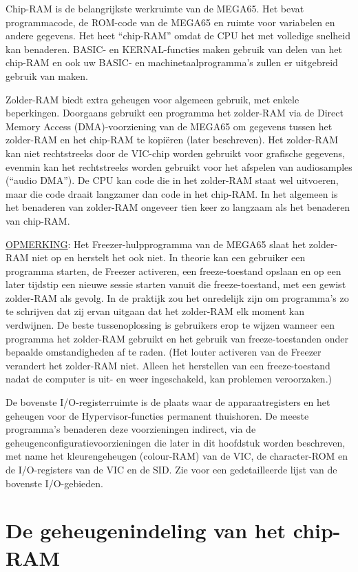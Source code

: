 Chip-RAM is de belangrijkste werkruimte van de MEGA65. Het bevat programmacode, de ROM-code van de MEGA65 en ruimte voor variabelen en andere gegevens. Het heet ``chip-RAM'' omdat de CPU het met volledige snelheid kan benaderen. BASIC- en KERNAL-functies maken gebruik van delen van het chip-RAM en ook uw BASIC- en machinetaalprogramma's zullen er uitgebreid gebruik van maken.

Zolder-RAM biedt extra geheugen voor algemeen gebruik, met enkele beperkingen. Doorgaans gebruikt een programma het zolder-RAM via de Direct Memory Access (DMA)-voorziening van de MEGA65 om gegevens tussen het zolder-RAM en het chip-RAM te kopiëren (later beschreven). Het zolder-RAM kan niet rechtstreeks door de VIC-chip worden gebruikt voor grafische gegevens, evenmin kan het rechtstreeks worden gebruikt voor het afspelen van audiosamples (``audio DMA''). De CPU kan code die in het zolder-RAM staat wel uitvoeren, maar die code draait langzamer dan code in het chip-RAM. In het algemeen is het benaderen van zolder-RAM ongeveer tien keer zo langzaam als het benaderen van chip-RAM.

\underline{OPMERKING}: Het Freezer-hulpprogramma van de MEGA65 slaat het zolder-RAM niet op en herstelt het ook niet. In theorie kan een gebruiker een programma starten, de Freezer activeren, een freeze-toestand opslaan en op een later tijdstip een nieuwe sessie starten vanuit die freeze-toestand, met een gewist zolder-RAM als gevolg. In de praktijk zou het onredelijk zijn om programma's zo te schrijven dat zij ervan uitgaan dat het zolder-RAM elk moment kan verdwijnen. De beste tussenoplossing is gebruikers erop te wijzen wanneer een programma het zolder-RAM gebruikt en het gebruik van freeze-toestanden onder bepaalde omstandigheden af te raden. (Het louter activeren van de Freezer verandert het zolder-RAM niet. Alleen het herstellen van een freeze-toestand nadat de computer is uit- en weer ingeschakeld, kan problemen veroorzaken.)

De bovenste I/O-registerruimte is de plaats waar de apparaatregisters en het geheugen voor de Hypervisor-functies permanent thuishoren. De meeste programma's benaderen deze voorzieningen indirect, via de geheugenconfiguratievoorzieningen die later in dit hoofdstuk worden beschreven, met name het kleurengeheugen (colour-RAM) van de VIC, de character-ROM en de I/O-registers van de VIC en de SID. Zie  voor een gedetailleerde lijst van de bovenste I/O-gebieden.


\newpage
\section{De geheugenindeling van het chip-RAM}

